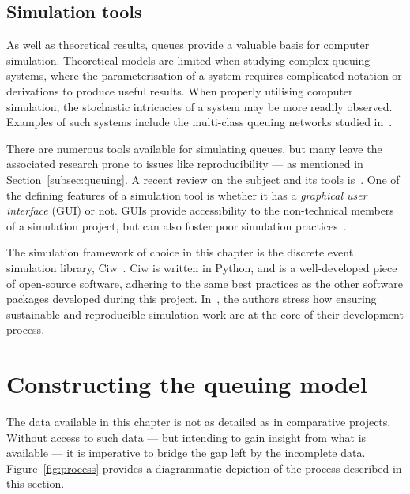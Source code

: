 \subsection{Simulation tools}\label{subsec:tools}

As well as theoretical results, queues provide a valuable basis for computer
simulation. Theoretical models are limited when studying complex queuing
systems, where the parameterisation of a system requires complicated notation or
derivations to produce useful results. When properly utilising computer
simulation, the stochastic intricacies of a system may be more readily observed.
Examples of such systems include the multi-class queuing networks studied
in~\cite{Cochran2009}.

There are numerous tools available for simulating queues, but many leave the
associated research prone to issues like reproducibility --- as mentioned in
Section~\ref{subsec:queuing}. A recent review on the subject and its tools
is~\cite{Dagkakis2016}. One of the defining features of a simulation tool is
whether it has a \emph{graphical user interface} (GUI) or not. GUIs provide
accessibility to the non-technical members of a simulation project, but can also
foster poor simulation practices~\cite{Bell1987}.

The simulation framework of choice in this chapter is the discrete event
simulation library, Ciw~\cite{Palmer2019}. Ciw is written in Python, and is a
well-developed piece of open-source software, adhering to the same best
practices as the other software packages developed during this project.
In~\cite{Palmer2019}, the authors stress how ensuring sustainable and
reproducible simulation work are at the core of their development process.


\section{Constructing the queuing model}\label{sec:model}

The data available in this chapter is not as detailed as in comparative
projects. Without access to such data --- but intending to gain insight from
what is available --- it is imperative to bridge the gap left by the incomplete
data. Figure~\ref{fig:process} provides a diagrammatic depiction of the process
described in this section.


